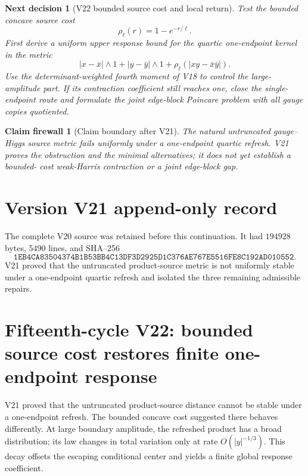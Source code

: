 \documentclass[11pt]{article}
\newtheorem{firewall}[theorem]{Claim firewall}
\newtheorem{decision}[theorem]{Next decision}
\theoremstyle{remark}
\begin{document}
\begin{decision}[V22 bounded source cost and local return]
\label{dec:v15v21-next}
Test the bounded concave source cost
\[
 \rho_\ell(r)=1-e^{-r/\ell}.                                \tag{21.20}
\]
First derive a uniform upper response bound for the quartic
one-endpoint kernel in the metric
\[
 |x-\bar x|\wedge1+|y-\bar y|\wedge1+
 \rho_\ell(|xy-\bar x\bar y|).
\]
Use the determinant-weighted fourth moment of V18 to control the
large-amplitude part.  If its contraction coefficient still reaches
one, close the single-endpoint route and formulate the joint
edge-block Poincare problem with all gauge copies quotiented.
\end{decision}

\begin{firewall}[Claim boundary after V21]
\label{fire:v15v21}
The natural untruncated gauge--Higgs source metric fails uniformly
under a one-endpoint quartic refresh.  V21 proves the obstruction
and the minimal alternatives; it does not yet establish a bounded-
cost weak-Harris contraction or a joint edge-block gap.
\end{firewall}

\section*{Version V21 append-only record}
The complete V20 source was retained before this continuation.  It
had \(194928\) bytes, \(5490\) lines, and SHA--256
\[
 \texttt{1EB4CA83504374B1B53BB4C13DF3D2925D1C376AE767E5516FE8C192AD010552}.
\]
V21 proved that the untruncated product-source metric is not
uniformly stable under a one-endpoint quartic refresh and isolated
the three remaining admissible repairs.
\section{Fifteenth-cycle V22: bounded source cost restores finite one-endpoint response}
\label{sec:v15v22}

V21 proved that the untruncated product-source distance cannot be
stable under a one-endpoint refresh.  The bounded concave cost
suggested there behaves differently.  At large boundary amplitude,
the refreshed product has a broad distribution; its law changes in
total variation only at rate \(O(|y|^{-1/3})\).  This decay offsets
the escaping conditional center and yields a finite global response
coefficient.
\end{document}
